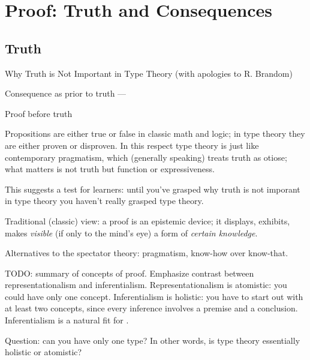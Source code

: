 \section{Proof: Truth and Consequences}
\label{sect:prooftruth}


\subsection{Truth}
\label{subs:truth}

Why Truth is Not Important in Type Theory (with apologies to
R. Brandom\cite{brandom_why_2009})

Consequence as prior to truth --- \cite{schroeder-heister_pts}

Proof before truth \cite{schroeder-heister_validity_2006}

\begin{ednote}
  Propositions are either true or false in classic math and logic; in
  type theory they are either proven or disproven.  In this respect
  type theory is just like contemporary pragmatism, which (generally
  speaking) treats truth as otiose; what matters is not truth but
  function or expressiveness.

  This suggests a test for learners: until you've grasped why truth is
  not imporant in type theory you haven't really grasped type theory.
\end{ednote}

Traditional (classic) view: a proof is an epistemic device; it
displays, exhibits, makes \textit{visible} (if only to the mind's eye)
a form of \textit{certain knowledge}.

Alternatives to the spectator theory: pragmatism, know-how over know-that.

\begin{ednote}
  TODO: summary of concepts of proof.  Emphasize contrast between
  representationalism and inferentialism.  Representationalism is
  atomistic: you could have only one concept.  Inferentialism is
  holistic: you have to start out with at least two concepts, since
  every inference involves a premise and a conclusion.  Inferentialism
  is a natural fit for \HoTT.

  Question: can you have only one type?  In other words, is type
  theory essentially holistic or atomistic?
\end{ednote}


